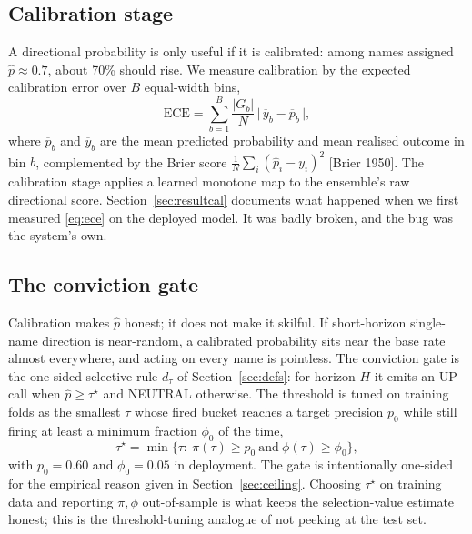 \documentclass[10pt, a4paper, oneside]{article}
\theoremstyle{definition}
\theoremstyle{plain}
\newcommand{\ece}{\mathrm{ECE}}
\newcommand{\Pup}{\hat p}
\begin{document}
\subsection{Calibration stage}
\label{sec:cal}
A directional probability is only useful if it is calibrated: among names assigned
$\Pup\approx0.7$, about 70\% should rise. We measure calibration by the expected
calibration error over $B$ equal-width bins,
\begin{equation}
\label{eq:ece}
\ece=\sum_{b=1}^{B}\frac{|G_b|}{N}\,\big|\,\overline{y}_b-\overline{p}_b\,\big|,
\end{equation}
where $\overline{p}_b$ and $\overline{y}_b$ are the mean predicted probability and mean
realised outcome in bin $b$, complemented by the Brier score
$\tfrac1N\sum_i(\Pup_i-y_i)^2$ [Brier 1950]. The calibration stage applies a learned
monotone map to the ensemble's raw directional score. Section~\ref{sec:resultcal}
documents what happened when we first measured \eqref{eq:ece} on the deployed model.
It was badly broken, and the bug was the system's own.

\subsection{The conviction gate}
\label{sec:gate}
Calibration makes $\Pup$ honest; it does not make it skilful. If short-horizon
single-name direction is near-random, a calibrated probability sits near the base rate
almost everywhere, and acting on every name is pointless. The conviction gate is the
one-sided selective rule $d_\tau$ of Section~\ref{sec:defs}: for horizon $H$ it emits
an UP call when $\Pup\ge\tau^\star$ and NEUTRAL otherwise. The threshold is tuned on
training folds as the smallest $\tau$ whose fired bucket reaches a target precision
$p_0$ while still firing at least a minimum fraction $\phi_0$ of the time,
\begin{equation}
\label{eq:tau}
\tau^\star=\min\big\{\tau:\ \pi(\tau)\ge p_0\ \text{and}\ \phi(\tau)\ge\phi_0\big\},
\end{equation}
with $p_0=0.60$ and $\phi_0=0.05$ in deployment. The gate is intentionally one-sided
for the empirical reason given in Section~\ref{sec:ceiling}. Choosing $\tau^\star$ on
training data and reporting $\pi,\phi$ out-of-sample is what keeps the selection-value
estimate honest; this is the threshold-tuning analogue of not peeking at the test set.
\end{document}
